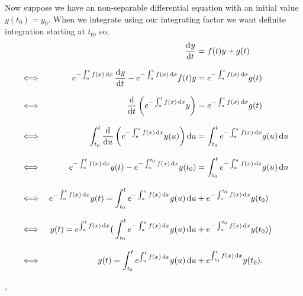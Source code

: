 \documentclass[../MathsNotesBase.tex]{subfiles}
\begin{document}
{		Now suppose we have an non-separable differential equation with an initial value ${ y(t_0) = y_0 }$. When we integrate using our integrating factor we want definite integration starting at $t_0$, so,
		\begin{align*}
			&& \dod{y}{t} &= f(t)y + g(t) \\[8pt]
			&\iff & e^{-\int_a^t f(x) \dif x} \dod{y}{t} - e^{-\int_a^t f(x) \dif x} f(t) y &= e^{-\int_a^t f(x) \dif x} g(t) \\[8pt]
			&\iff & \dod{}{t} \left( e^{-\int_a^t f(x) \dif x} y\right ) &= e^{-\int_a^t f(x) \dif x} g(t) \\[8pt]
			&\iff & \int_{t_0}^t \dod{}{u} \left( e^{-\int_a^u f(x) \dif x} y(u)\right ) \dif u &= \int_{t_0}^t e^{-\int_a^u f(x) \dif x} g(u) \dif u \\[8pt]
			&\iff & e^{-\int_a^t f(x) \dif x} y(t) - e^{-\int_a^{t_0} f(x) \dif x} y(t_0) &= \int_{t_0}^t e^{-\int_a^u f(x) \dif x} g(u) \dif u \\[8pt]
			&\iff & e^{-\int_a^t f(x) \dif x} y(t) = \int_{t_0}^t e^{-\int_a^u f(x) \dif x} g(u) \dif u &+ e^{-\int_a^{t_0} f(x) \dif x} y(t_0) \\[8pt]
			&\iff & y(t) = e^{\int_a^t f(x) \dif x} \big( \int_{t_0}^t e^{-\int_a^u f(x) \dif x} g(u) \dif u &+ e^{-\int_a^{t_0} f(x) \dif x} y(t_0) \big) \\[8pt]
			&\iff & y(t) = \int_{t_0}^t e^{\int_u^t f(x) \dif x} g(u) \dif u &+ e^{\int_{t_0}^t f(x) \dif x} y(t_0).
		\end{align*}
		
		\sep
}
\end{document}

